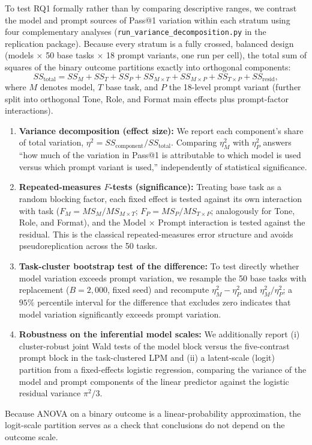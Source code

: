 \documentclass[a4paper,fleqn]{cas-sc}
\providecommand{\tightlist}{%
  \setlength{\itemsep}{0pt}\setlength{\parskip}{0pt}}
\begin{document}
To test RQ1 formally rather than by comparing descriptive ranges, we contrast the model and prompt sources of Pass@1 variation within each stratum using four complementary analyses (\texttt{run\_variance\_decomposition.py} in the replication package). Because every stratum is a fully crossed, balanced design (models $\times$ 50 base tasks $\times$ 18 prompt variants, one run per cell), the total sum of squares of the binary outcome partitions exactly into orthogonal components:
\begin{equation}
SS_{\text{total}} = SS_{M} + SS_{T} + SS_{P} + SS_{M \times T} + SS_{M \times P} + SS_{T \times P} + SS_{\text{resid}},
\label{eq:anova-decomposition}
\end{equation}
where $M$ denotes model, $T$ base task, and $P$ the 18-level prompt variant (further split into orthogonal Tone, Role, and Format main effects plus prompt-factor interactions).
\begin{enumerate}
\tightlist
\item \textbf{Variance decomposition (effect size):} We report each component's share of total variation, $\eta^2 = SS_{\text{component}} / SS_{\text{total}}$. Comparing $\eta^2_{M}$ with $\eta^2_{P}$ answers ``how much of the variation in Pass@1 is attributable to which model is used versus which prompt variant is used,'' independently of statistical significance.
\item \textbf{Repeated-measures $F$-tests (significance):} Treating base task as a random blocking factor, each fixed effect is tested against its own interaction with task ($F_M = MS_M / MS_{M \times T}$; $F_P = MS_P / MS_{T \times P}$; analogously for Tone, Role, and Format), and the Model $\times$ Prompt interaction is tested against the residual. This is the classical repeated-measures error structure and avoids pseudoreplication across the 50 tasks.
\item \textbf{Task-cluster bootstrap test of the difference:} To test directly whether model variation exceeds prompt variation, we resample the 50 base tasks with replacement ($B = 2{,}000$, fixed seed) and recompute $\eta^2_{M} - \eta^2_{P}$ and $\eta^2_{M} / \eta^2_{P}$; a $95\%$ percentile interval for the difference that excludes zero indicates that model variation significantly exceeds prompt variation.
\item \textbf{Robustness on the inferential model scales:} We additionally report (i) cluster-robust joint Wald tests of the model block versus the five-contrast prompt block in the task-clustered LPM and (ii) a latent-scale (logit) partition from a fixed-effects logistic regression, comparing the variance of the model and prompt components of the linear predictor against the logistic residual variance $\pi^2/3$.
\end{enumerate}
Because ANOVA on a binary outcome is a linear-probability approximation, the logit-scale partition serves as a check that conclusions do not depend on the outcome scale.
\end{document}
